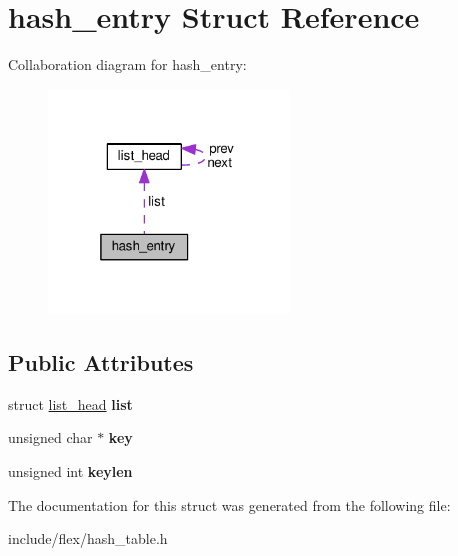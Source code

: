 \hypertarget{structhash__entry}{}\section{hash\+\_\+entry Struct Reference}
\label{structhash__entry}


Collaboration diagram for hash\+\_\+entry\+:\nopagebreak
\begin{figure}[H]
\begin{center}
\leavevmode
\includegraphics[width=181pt]{structhash__entry__coll__graph}
\end{center}
\end{figure}
\subsection*{Public Attributes}
\begin{DoxyCompactItemize}
\item 
struct \hyperlink{structlist__head}{list\+\_\+head} {\bfseries list}\hypertarget{structhash__entry_ada52d1b11e544cd19b58007cc3713069}{}\label{structhash__entry_ada52d1b11e544cd19b58007cc3713069}

\item 
unsigned char $\ast$ {\bfseries key}\hypertarget{structhash__entry_a0c23748b9dddd5f11b1ff9dbcbd47e9c}{}\label{structhash__entry_a0c23748b9dddd5f11b1ff9dbcbd47e9c}

\item 
unsigned int {\bfseries keylen}\hypertarget{structhash__entry_a6f87c5657a590b7a848cc3f9a1d30d13}{}\label{structhash__entry_a6f87c5657a590b7a848cc3f9a1d30d13}

\end{DoxyCompactItemize}


The documentation for this struct was generated from the following file\+:\begin{DoxyCompactItemize}
\item 
include/flex/hash\+\_\+table.\+h\end{DoxyCompactItemize}
